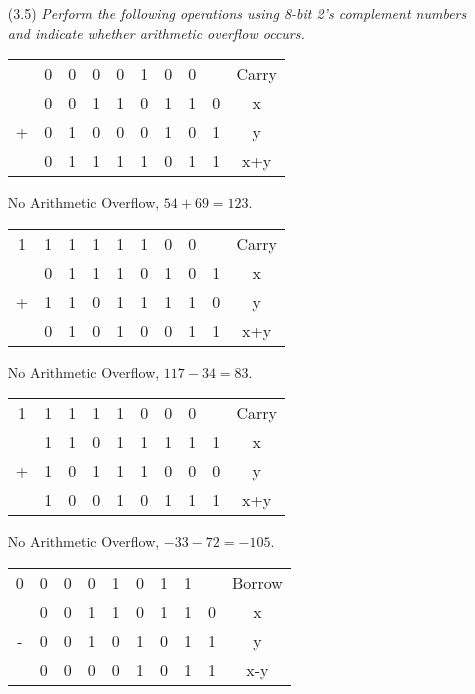 \documentclass[12pt]{article}
\begin{document}
\begin{enumerate}
\begin{enumerate}
          \vspace{10mm}
          \item[(3.5)] \textit{Perform the following operations using 8-bit 2's complement numbers and indicate whether arithmetic overflow occurs.}
          \begin{center}
            \begin{tabular}{c c c c c c c c c c}
                \\
                & 0 & 0 & 0 & 0 & 1 & 0 & 0 && Carry\\
                & 0 & 0 & 1 & 1 & 0 & 1 & 1 & 0 & x\\
              + & 0 & 1 & 0 & 0 & 0 & 1 & 0 & 1 & y\\
                \hline
                & 0 & 1 & 1 & 1 & 1 & 0 & 1 & 1 & x+y
            \end{tabular}

            No Arithmetic Overflow, $54 + 69 = 123$.

            \begin{tabular}{c c c c c c c c c c}
                \\
              1 & 1 & 1 & 1 & 1 & 1 & 0 & 0 && Carry\\
                & 0 & 1 & 1 & 1 & 0 & 1 & 0 & 1 & x\\
              + & 1 & 1 & 0 & 1 & 1 & 1 & 1 & 0 & y\\
                \hline
                & 0 & 1 & 0 & 1 & 0 & 0 & 1 & 1 & x+y
            \end{tabular}

            No Arithmetic Overflow, $117 - 34 = 83$.

            \begin{tabular}{c c c c c c c c c c}
                \\
              1 & 1 & 1 & 1 & 1 & 0 & 0 & 0 && Carry\\
                & 1 & 1 & 0 & 1 & 1 & 1 & 1 & 1 & x\\
              + & 1 & 0 & 1 & 1 & 1 & 0 & 0 & 0 & y\\
                \hline
                & 1 & 0 & 0 & 1 & 0 & 1 & 1 & 1 & x+y
            \end{tabular}

            No Arithmetic Overflow, $-33-72 = -105$.

            \begin{tabular}{c c c c c c c c c c}
                \\
              0 & 0 & 0 & 0 & 1 & 0 & 1 & 1 && Borrow\\
                & 0 & 0 & 1 & 1 & 0 & 1 & 1 & 0 & x\\
              - & 0 & 0 & 1 & 0 & 1 & 0 & 1 & 1 & y\\
                \hline
                & 0 & 0 & 0 & 0 & 1 & 0 & 1 & 1 & x-y
            \end{tabular}


\end{center}
\end{enumerate}
\end{enumerate}
\end{document}
